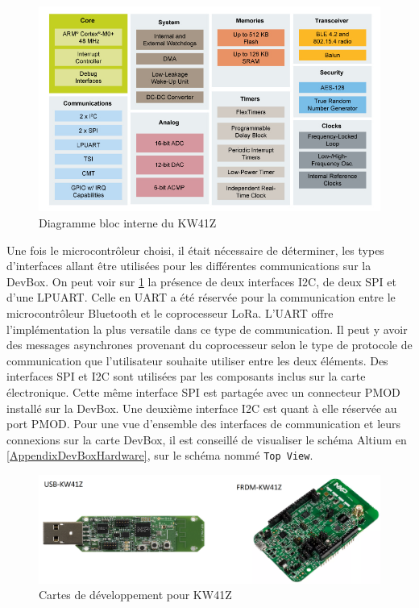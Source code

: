 \begin{figure}[ht!]
    \centering
    \includegraphics[width=\textwidth]{Figures/Hardware/KW41Z_block_diagram.jpg}
    \caption{Diagramme bloc interne du KW41Z}
    \label{fig-KW41Z_block_diagram}
\end{figure}

Une fois le microcontrôleur choisi, il était nécessaire de déterminer, les types d'interfaces allant être utilisées pour les différentes communications sur la DevBox. On peut voir sur \cref{fig-KW41Z_block_diagram} la présence de deux interfaces I2C, de deux SPI et d'une LPUART. Celle en UART a été réservée pour la communication entre le microcontrôleur Bluetooth et le coprocesseur LoRa. L'UART offre l'implémentation la plus versatile dans ce type de communication. Il peut y avoir des messages asynchrones provenant du coprocesseur selon le type de protocole de communication que l'utilisateur souhaite utiliser entre les deux éléments. Des interfaces SPI et I2C sont utilisées par les composants inclus sur la carte électronique. Cette même interface SPI est partagée avec un connecteur PMOD installé sur la DevBox. Une deuxième interface I2C est quant à elle réservée au port PMOD. Pour une vue d'ensemble des interfaces de communication et leurs connexions sur la carte DevBox, il est conseillé de visualiser le schéma Altium en \cref{AppendixDevBoxHardware}, sur le schéma nommé \texttt{Top View}.\\

\begin{figure}[ht!]
    \centering
    \includegraphics[width=\textwidth]{Figures/Hardware/nxp_dev_boards.png}
    \caption{Cartes de développement pour KW41Z}
    \label{fig-nxp_dev_boards}
\end{figure}


